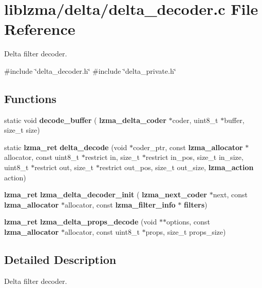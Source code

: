 \section{liblzma/delta/delta\+\_\+decoder.c File Reference}
\label{delta__decoder_8c}


Delta filter decoder.  


{\ttfamily \#include \char`\"{}delta\+\_\+decoder.\+h\char`\"{}}\newline
{\ttfamily \#include \char`\"{}delta\+\_\+private.\+h\char`\"{}}\newline
\subsection*{Functions}
\begin{DoxyCompactItemize}
\item 
\mbox{\label{delta__decoder_8c_a546cba3189913ec756d75a7e5201b50a}} 
static void {\bfseries decode\+\_\+buffer} (\textbf{ lzma\+\_\+delta\+\_\+coder} $\ast$coder, uint8\+\_\+t $\ast$buffer, size\+\_\+t size)
\item 
\mbox{\label{delta__decoder_8c_acc766fe6e364a0da9d75284b556777a0}} 
static \textbf{ lzma\+\_\+ret} {\bfseries delta\+\_\+decode} (void $\ast$coder\+\_\+ptr, const \textbf{ lzma\+\_\+allocator} $\ast$allocator, const uint8\+\_\+t $\ast$restrict in, size\+\_\+t $\ast$restrict in\+\_\+pos, size\+\_\+t in\+\_\+size, uint8\+\_\+t $\ast$restrict out, size\+\_\+t $\ast$restrict out\+\_\+pos, size\+\_\+t out\+\_\+size, \textbf{ lzma\+\_\+action} action)
\item 
\mbox{\label{delta__decoder_8c_ac9375bb1064c5b6937486dc52fb3bdff}} 
\textbf{ lzma\+\_\+ret} {\bfseries lzma\+\_\+delta\+\_\+decoder\+\_\+init} (\textbf{ lzma\+\_\+next\+\_\+coder} $\ast$next, const \textbf{ lzma\+\_\+allocator} $\ast$allocator, const \textbf{ lzma\+\_\+filter\+\_\+info} $\ast$\textbf{ filters})
\item 
\mbox{\label{delta__decoder_8c_a6a5d57421d63f10a659762b2938ff31d}} 
\textbf{ lzma\+\_\+ret} {\bfseries lzma\+\_\+delta\+\_\+props\+\_\+decode} (void $\ast$$\ast$options, const \textbf{ lzma\+\_\+allocator} $\ast$allocator, const uint8\+\_\+t $\ast$props, size\+\_\+t props\+\_\+size)
\end{DoxyCompactItemize}


\subsection{Detailed Description}
Delta filter decoder. 

